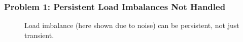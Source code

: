 {%
\begin{frame}
\frametitle{Problem 1: Persistent Load Imbalances Not Handled}
\begin{figure}
\caption{\small Load imbalance (here shown due to noise) can be persistent, not just transient.}
\end{figure}
\end{frame}

}
